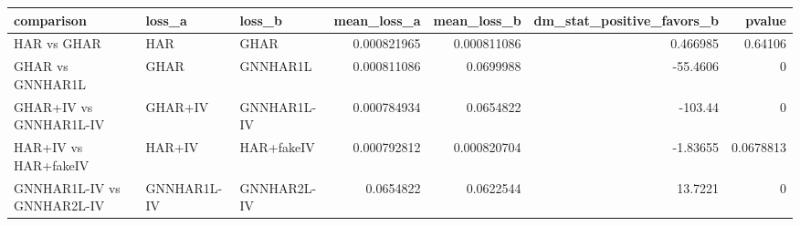 \begin{tabular}{lllrrrr}
\toprule
comparison & loss_a & loss_b & mean_loss_a & mean_loss_b & dm_stat_positive_favors_b & pvalue \\
\midrule
HAR vs GHAR & HAR & GHAR & 0.000821965 & 0.000811086 & 0.466985 & 0.64106 \\
GHAR vs GNNHAR1L & GHAR & GNNHAR1L & 0.000811086 & 0.0699988 & -55.4606 & 0 \\
GHAR+IV vs GNNHAR1L-IV & GHAR+IV & GNNHAR1L-IV & 0.000784934 & 0.0654822 & -103.44 & 0 \\
HAR+IV vs HAR+fakeIV & HAR+IV & HAR+fakeIV & 0.000792812 & 0.000820704 & -1.83655 & 0.0678813 \\
GNNHAR1L-IV vs GNNHAR2L-IV & GNNHAR1L-IV & GNNHAR2L-IV & 0.0654822 & 0.0622544 & 13.7221 & 0 \\
\bottomrule
\end{tabular}
